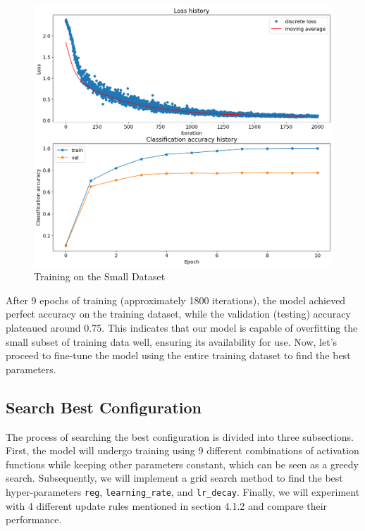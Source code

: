 \documentclass[10pt,a4paper,twoside]{tau}
\begin{document}
\begin{figure}[hbp]
    \centering
    \includegraphics[scale=0.3]{images/sanity_check.png}
    \caption{Training on the Small Dataset}
    \label{fig:sanity-check}
\end{figure}

After 9 epochs of training (approximately 1800 iterations), the model achieved perfect accuracy on the training dataset, while the validation (testing) accuracy plateaued around 0.75. This indicates that our model is capable of overfitting the small subset of training data well, ensuring its availability for use. Now, let's proceed to fine-tune the model using the entire training dataset to find the best parameters.


\subsection{Search Best Configuration}

The process of searching the best configuration is divided into three subsections. First, the model will undergo training using 9 different combinations of activation functions while keeping other parameters constant, which can be seen as a greedy search. Subsequently, we will implement a grid search method to find the best hyper-parameters \texttt{reg}, \texttt{learning\_rate}, and \texttt{lr\_decay}. Finally, we will experiment with 4 different update rules mentioned in section 4.1.2 and compare their performance.
\end{document}
